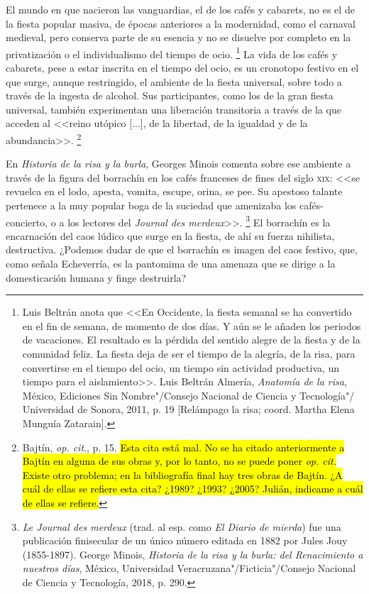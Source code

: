\documentclass[14pt,twoside,final]{extbook} %
\let\oldfootnote\footnote
\renewcommand\footnote[1]{%
\oldfootnote{\hspace{1mm}#1}}
\begin{document}
El mundo en que nacieron las vanguardias, el de los cafés y cabarets, no es el de la fiesta popular masiva, de épocas anteriores a la modernidad, como el carnaval medieval, pero conserva parte de su esencia y no se disuelve por completo en la privatización o el individualismo del tiempo de ocio.\footnote{Luis Beltrán anota que <<En Occidente, la fiesta semanal se ha convertido en el fin de semana, de momento de dos días. Y aún se le añaden los periodos de vacaciones. El resultado es la pérdida del sentido alegre de la fiesta y de la comunidad feliz. La fiesta deja de ser el tiempo de la alegría, de la risa, para convertirse en el tiempo del ocio, un tiempo sin actividad productiva, un tiempo para el aislamiento>>. Luis Beltrán Almería, \emph{Anatomía de la risa}, México, Ediciones Sin Nombre"/Consejo Nacional de Ciencia y Tecnología"/ Universidad de Sonora, 2011, p. 19 [Relámpago la risa; coord. Martha Elena Munguía Zatarain].} La vida de los cafés y cabarets, pese a estar inscrita en el tiempo del ocio, es un cronotopo festivo en el que surge, aunque restringido, el ambiente de la fiesta universal, sobre todo a través de la ingesta de alcohol. Sus participantes, como los de la gran fiesta universal, también experimentan una liberación transitoria a través de la que acceden al <<reino utópico [...], de la libertad, de la igualdad y de la abundancia>>.\footnote{Bajtín, \emph{op. cit}., p. 15. \hl{Esta cita está mal. No se ha citado anteriormente a Bajtín en alguna de sus obras y, por lo tanto, no se puede poner \emph{op. cit.} Existe otro problema; en la bibliografía final hay tres obras de Bajtín. ¿A cuál de ellas se refiere esta cita? ¿1989? ¿1993? ¿2005? Julián, indicame a cuál de ellas se refiere.}}

En \emph{Historia de la risa y la burla}, Georges Minois comenta sobre ese ambiente a través de la figura del borrachín en los cafés franceses de fines del siglo \textsc{xix}: <<se revuelca en el lodo, apesta, vomita, escupe, orina, se pee. Su apestoso talante pertenece a la muy popular boga de la suciedad que amenizaba los cafés-concierto, o a los lectores del \emph{Journal des merdeux}>>.\footnote{\emph{Le Journal des merdeux} (trad. al esp. como \emph{El Diario de mierda}) fue una publicación finisecular de un único número editada en 1882 por Jules Jouy (1855-1897). George Minois, \emph{Historia de la risa y la burla: del Renacimiento a nuestros días}, México, Universidad Veracruzana"/Ficticia"/Consejo Nacional de Ciencia y Tecnología, 2018, p. 290.} El borrachín es la encarnación del caos lúdico que surge en la fiesta, de ahí su fuerza nihilista, destructiva. ¿Podemos dudar de que el borrachín es imagen del caos festivo, que, como señala Echeverría, es la pantomima de una amenaza que se dirige a la domesticación humana y finge destruirla?
\end{document}
